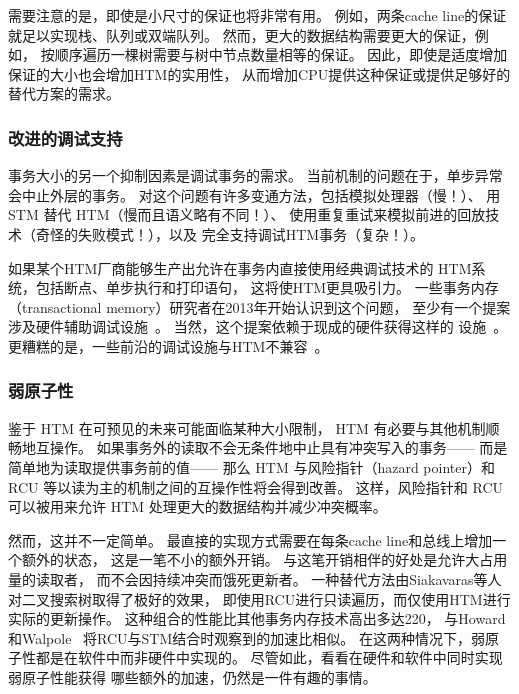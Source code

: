 需要注意的是，即使是小尺寸的保证也将非常有用。
例如，两条cache line的保证就足以实现栈、队列或双端队列。
然而，更大的数据结构需要更大的保证，例如，
按顺序遍历一棵树需要与树中节点数量相等的保证。
因此，即使是适度增加保证的大小也会增加HTM的实用性，
从而增加CPU提供这种保证或提供足够好的替代方案的需求。

\subsubsection{改进的调试支持}
\label{sec:future:Improved Debugging Support}

事务大小的另一个抑制因素是调试事务的需求。
当前机制的问题在于，单步异常会中止外层的事务。
对这个问题有许多变通方法，包括模拟处理器（慢！）、
用 STM 替代 HTM（慢而且语义略有不同！）、
使用重复重试来模拟前进的回放技术（奇怪的失败模式！），以及
完全支持调试HTM事务（复杂！）。

如果某个HTM厂商能够生产出允许在事务内直接使用经典调试技术的
HTM系统，包括断点、单步执行和打印语句，
这将使HTM更具吸引力。
一些事务内存（transactional memory）研究者在2013年开始认识到这个问题，
至少有一个提案涉及硬件辅助调试设施~\cite{JustinGottschlich2013TMdebug}。
当然，这个提案依赖于现成的硬件获得这样的
设施~\cite{TimothyHayes2020ARM-HTM,Intel2020TSXdevguide}。
更糟糕的是，一些前沿的调试设施与HTM不兼容~\cite{RobertOCallahan2020DebuggingHTM}。

\subsubsection{弱原子性}
\label{sec:future:Weak Atomicity}

鉴于 HTM 在可预见的未来可能面临某种大小限制，
HTM 有必要与其他机制顺畅地互操作。
如果事务外的读取不会无条件地中止具有冲突写入的事务——
而是简单地为读取提供事务前的值——
那么 HTM 与风险指针（hazard pointer）和 RCU 等以读为主的机制之间的互操作性将会得到改善。
这样，风险指针和 RCU 可以被用来允许 HTM 处理更大的数据结构并减少冲突概率。

然而，这并不一定简单。
最直接的实现方式需要在每条cache line和总线上增加一个额外的状态，
这是一笔不小的额外开销。
与这笔开销相伴的好处是允许大占用量的读取者，
而不会因持续冲突而饿死更新者。
一种替代方法由Siakavaras等人~\cite{Siakavaras2017CombiningHA}
对二叉搜索树取得了极好的效果，
即使用RCU进行只读遍历，而仅使用HTM进行实际的更新操作。
这种组合的性能比其他事务内存技术高出多达220\pct，
与Howard和Walpole~\cite{PhilHoward2011RCUTMRBTree}
将RCU与STM结合时观察到的加速比相似\@。
在这两种情况下，弱原子性都是在软件中而非硬件中实现的。
尽管如此，看看在硬件和软件中同时实现弱原子性能获得
哪些额外的加速，仍然是一件有趣的事情。

